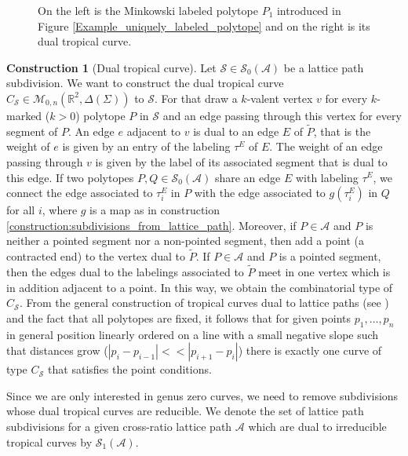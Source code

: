 \documentclass[11pt,reqno,a4]{amsart}
\theoremstyle{dotless}
\theoremstyle{definition}
\newtheorem{construction}[corollary]{Construction}
\begin{document}
\begin{figure}
\centering
\def\svgwidth{200pt}

\caption{On the left is the Minkowski labeled polytope $P_1$ introduced in Figure \ref{Example_uniquely_labeled_polytope} and on the right is its dual tropical curve.}
\label{Example_dual_tropical_curve}
\end{figure}

\begin{construction}[Dual tropical curve]\label{construction:dual_tropical_curve}
Let $\mathcal{S}\in\mathcal{S}_0(\mathcal{A})$ be a lattice path subdivision. We want to construct the dual tropical curve $C_\mathcal{S}\in\mathcal{M}_{0,n}\left(\mathbb{R}^2,\Delta(\Sigma) \right)$ to $\mathcal{S}$. For that draw a $k$-valent vertex $v$ for every $k$-marked ($k>0$) polytope $P$ in $\mathcal{S}$ and an edge passing through this vertex for every segment of $P$. An edge $e$ adjacent to $v$ is dual to an edge $E$ of $\tilde{P}$, that is the weight of $e$ is given by an entry of the labeling $\tau^E$ of $E$. The weight of an edge passing through $v$ is given by the label of its associated segment that is dual to this edge.
If two polytopes $P,Q\in\mathcal{S}_0(\mathcal{A})$ share an edge $E$ with labeling $\tau^E$, we connect the edge associated to $\tau^E_i$ in $P$ with the edge associated to $g\left( \tau^E_i\right)$ in $Q$ for all $i$, where $g$ is a map as in construction \ref{construction:subdivisions_from_lattice_path}. Moreover, if $P\in\mathcal{A}$ and $P$ is neither a pointed segment nor a non-pointed segment, then add a point (a contracted end) to the vertex dual to $\tilde{P}$. If $P\in\mathcal{A}$ and $P$ is a pointed segment, then the edges dual to the labelings associated to $\tilde{P}$ meet in one vertex which is in addition adjacent to a point. In this way, we obtain the combinatorial type of $C_\mathcal{S}$. From the general construction of tropical curves dual to lattice paths (see \cite{MikhalkinFundamental}) and the fact that all polytopes are fixed, it follows that for given points $p_1,\dots,p_n$ in general position linearly ordered on a line with a small negative slope such that distances grow ($|p_{i}-p_{i-1}| <<|p_{i+1}-p_i|$) there is exactly one curve of type $C_\mathcal{S}$ that satisfies the point conditions.
\end{construction}



Since we are only interested in genus zero curves, we need to remove  subdivisions whose dual tropical curves are reducible. We denote the  set of lattice path subdivisions for a given cross-ratio lattice path $\mathcal{A}$ which are dual to irreducible tropical curves by $\mathcal{S}_1(\mathcal{A})$. 
\end{document}
